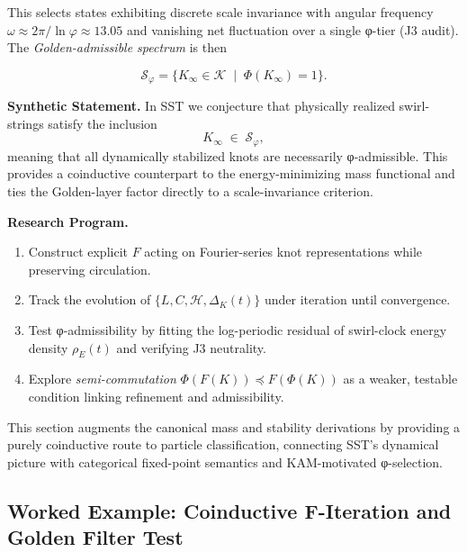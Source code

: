 \documentclass[10pt,reprint,aps,onecolumn,nofootinbib]{revtex4-2}
\begin{document}
        This selects states exhibiting discrete scale invariance
        with angular frequency
        \(
        \omega \approx 2\pi/\ln\varphi \approx 13.05
        \)
        and vanishing net fluctuation over a single φ-tier (J3 audit).
        The \emph{Golden-admissible spectrum} is then

        \[
            \mathcal{S}_\varphi = \{K_\infty \in \mathcal{K} \;\mid\; \Phi(K_\infty)=1 \}.
        \]

        \medskip

        \noindent
        \textbf{Synthetic Statement.}
        In SST we conjecture that physically realized swirl-strings
        satisfy the inclusion
        \[
            K_\infty \;\in\; \mathcal{S}_\varphi,
        \]
        meaning that all dynamically stabilized knots are necessarily φ-admissible.
        This provides a coinductive counterpart to the energy-minimizing mass functional
        and ties the Golden-layer factor directly to a scale-invariance criterion.

        \medskip

        \noindent
        \textbf{Research Program.}
        \begin{enumerate}[label=\roman*)]
            \item Construct explicit \(F\) acting on Fourier-series knot representations while
            preserving circulation.
            \item Track the evolution of \(\{L,C,\mathcal{H},\Delta_K(t)\}\) under iteration until convergence.
            \item Test φ-admissibility by fitting the log-periodic residual of swirl-clock energy density
            \(\rho_{\!E}(t)\) and verifying J3 neutrality.
            \item Explore \emph{semi-commutation} \(\Phi(F(K)) \preceq F(\Phi(K))\) as a weaker,
            testable condition linking refinement and admissibility.
        \end{enumerate}

        \noindent
        This section augments the canonical mass and stability derivations by
        providing a purely coinductive route to particle classification,
        connecting SST’s dynamical picture with categorical fixed-point semantics
        and KAM-motivated φ-selection.


        \subsection*{Worked Example: Coinductive F-Iteration and Golden Filter Test}
            \label{subsec:coinductive-golden-example}
\end{document}
